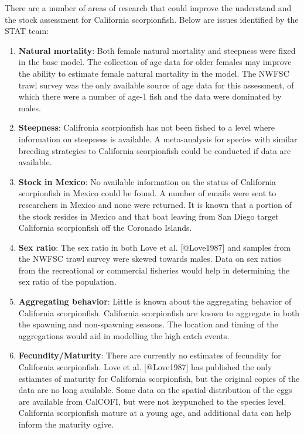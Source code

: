 \documentclass[12pt,]{article}
\begin{document}
There are a number of areas of research that could improve the
understand and the stock assessment for California scorpionfish. Below
are issues identified by the STAT team:

\begin{enumerate}

\item \textbf{Natural mortality}: Both female natural mortality and steepness were 
fixed in the base model.  The collection of age data for older females may improve 
the ability to estimate female natural mortality in the model.  The NWFSC trawl survey
was the only available source of age data for this assessment, of which there were a 
number of age-1 fish and the data were dominated by males.

\item \textbf{Steepness}: Califronia scorpionfish has not been fished to a level where information 
on steepness is available.  A meta-analysis for species with similar breeding strategies to 
California scorpionfish could be conducted if data are available.

\item \textbf{Stock in Mexico}:  No available information on the status of California 
scorpionfish in Mexico could be found.  A number of emails were sent to researchers 
in Mexico and none were returned.  It is known that a portion of the stock resides 
in Mexico and that boat leaving from San Diego target California scorpionfish off 
the Coronado Islands.  

\item \textbf{Sex ratio}:  The sex ratio in both Love et al. [@Love1987] and samples 
from the NWFSC trawl survey were skewed towards males. Data on sex ratios from the 
recreational or commercial fisheries would help in determining the sex ratio of the population.

\item \textbf{Aggregating behavior}: Little is known about the aggregating behavior
of California scorpionfish.  California scorpionfish are known to aggregate in both
the spawning and non-spawning seasons.  The location and timing of the aggregations
would aid in modelling the high catch events.

\item \textbf{Fecundity/Maturity}: There are currently no estimates of fecundity for California 
scorpionfish.  Love et al. [@Love1987] has published the only estiamtes of maturity for California 
scorpionfish, but the original copies of the data are no long available.  Some data on the spatial distribution of the eggs are available from CalCOFI, but were not keypunched to the species level. 
California scorpionfish mature at a young age, and additional data can help inform the maturity 
ogive.

\end{enumerate}
\end{document}
